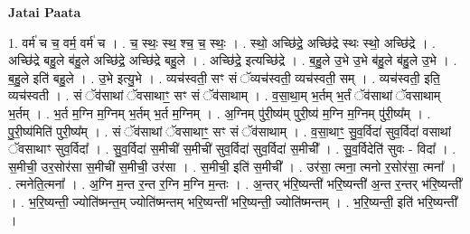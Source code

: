 \documentclass[17pt]{extarticle}
\begin{document}
\textbf{Jatai Paata} \newline

1. वर्म॑ च च॒ वर्म॒ वर्म॑ च । . च॒ स्थः॒ स्थ॒ श्च॒ च॒ स्थः॒ । . स्थो॒ अच्छि॑द्रे॒ अच्छि॑द्रे स्थः स्थो॒ अच्छि॑द्रे । . अच्छि॑द्रे बहु॒ले ब॑हु॒ले अच्छि॑द्रे॒ अच्छि॑द्रे बहु॒ले । . अच्छि॑द्रे॒ इत्यच्छि॑द्रे । . ब॒हु॒ले उ॒भे उ॒भे ब॑हु॒ले ब॑हु॒ले उ॒भे । . ब॒हु॒ले इति॑ बहु॒ले । . उ॒भे इत्यु॒भे । . व्यच॑स्वती॒ सꣳ सं ॅव्यच॑स्वती॒ व्यच॑स्वती॒ सम् । . व्यच॑स्वती॒ इति॒ व्यच॑स्वती । . सं ॅव॑साथां ॅवसाथाꣳ॒॒ सꣳ सं ॅव॑साथाम् । . व॒सा॒था॒म् भ॒र्तम् भ॒र्तं ॅव॑साथां ॅवसाथाम् भ॒र्तम् । . भ॒र्त म॒ग्नि म॒ग्निम् भ॒र्तम् भ॒र्त म॒ग्निम् । . अ॒ग्निम् पु॑री॒ष्य॑म् पुरी॒ष्य॑ म॒ग्नि म॒ग्निम् पु॑री॒ष्य᳚म् । . पु॒री॒ष्य॑मिति॑ पुरी॒ष्य᳚म् । . सं ॅव॑साथां ॅवसाथाꣳ॒॒ सꣳ सं ॅव॑साथाम् । . व॒सा॒थाꣳ॒॒ सु॒व॒र्विदा॑ सुव॒र्विदा॑ वसाथां ॅवसाथाꣳ सुव॒र्विदा᳚ । . सु॒व॒र्विदा॑ स॒मीची॑ स॒मीची॑ सुव॒र्विदा॑ सुव॒र्विदा॑ स॒मीची᳚ । . सु॒व॒र्विदेति॑ सुवः - विदा᳚ । . स॒मीची॒ उर॒सोर॑सा स॒मीची॑ स॒मीची॒ उर॑सा । . स॒मीची॒ इति॑ स॒मीची᳚ । . उर॑सा॒ त्मना॒ त्मनो र॒सोर॑सा॒ त्मना᳚ । . त्मनेति॒त्मना᳚ । . अ॒ग्नि म॒न्त र॒न्त र॒ग्नि म॒ग्नि म॒न्तः । . अ॒न्तर् भ॑रि॒ष्यन्ती॑ भरि॒ष्यन्ती॑ अ॒न्त र॒न्तर् भ॑रि॒ष्यन्ती᳚ । . भ॒रि॒ष्यन्ती॒ ज्योति॑ष्मन्त॒म् ज्योति॑ष्मन्तम् भरि॒ष्यन्ती॑ भरि॒ष्यन्ती॒ ज्योति॑ष्मन्तम् । . भ॒रि॒ष्यन्ती॒ इति॑ भरि॒ष्यन्ती᳚ । \newline
\end{document}
